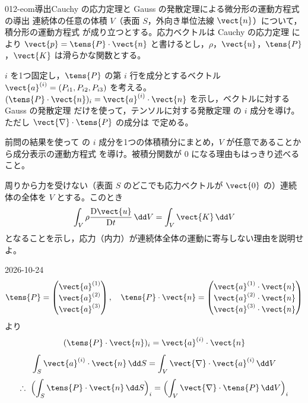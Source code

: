 \documentclass[uplatex,dvipdfmx,a4paper,11pt]{jsarticle}
\begin{document}
\begin{mondai}{012-eom}{導出}{Cauchy の応力定理と Gauss の発散定理による微分形の運動方程式の導出}
連続体の任意の体積 $V$（表面 $S$，外向き単位法線 $\vect{n}$）について，積分形の運動方程式  が成り立つとする。応力ベクトルは Cauchy の応力定理  により $\vect{p}=\tens{P}\cdot\vect{n}$ と書けるとし，$\rho$，$\vect{u}$，$\tens{P}$，$\vect{K}$ は滑らかな関数とする。
\begin{shoumon}
  \item $i$ を1つ固定し，$\tens{P}$ の第 $i$ 行を成分とするベクトル $\vect{a}^{(i)}=(P_{i1},P_{i2},P_{i3})$ を考える。$(\tens{P}\cdot\vect{n})_i=\vect{a}^{(i)}\cdot\vect{n}$ を示し，ベクトルに対する Gauss の発散定理  だけを使って，テンソルに対する発散定理  の $i$ 成分を導け。ただし $\vect{\nabla}\cdot\tens{P}$ の成分は  で定める。
  \item 前問の結果を使って  の $i$ 成分を1つの体積積分にまとめ，$V$ が任意であることから成分表示の運動方程式  を導け。被積分関数が $0$ になる理由もはっきり述べること。
  \item 周りから力を受けない（表面 $S$ のどこでも応力ベクトルが $\vect{0}$ の）連続体の全体を $V$ とする。このとき
  \[ \int_V \rho\frac{\mathrm{D}\vect{u}}{\mathrm{D}t}\,\dd V=\int_V \vect{K}\,\dd V \]
  となることを示し，応力（内力）が連続体全体の運動に寄与しない理由を説明せよ。
\end{shoumon}
\begin{kotaeutsushi}{2026-10-24}
\[ \tens{P}=\begin{pmatrix}\vect{a}^{(1)}\\\vect{a}^{(2)}\\\vect{a}^{(3)}\end{pmatrix},\quad \tens{P}\cdot\vect{n}=\begin{pmatrix}\vect{a}^{(1)}\cdot\vect{n}\\\vect{a}^{(2)}\cdot\vect{n}\\\vect{a}^{(3)}\cdot\vect{n}\end{pmatrix} \]
より
\[ (\tens{P}\cdot\vect{n})_{i}=\vect{a}^{(i)}\cdot\vect{n} \]
\[ \int_{S}\vect{a}^{(i)}\cdot\vect{n}\,\dd S=\int_{V}\vect{\nabla}\cdot\vect{a}^{(i)}\,\dd V \]
\[ \therefore\ \Bigl(\int_{S}\tens{P}\cdot\vect{n}\,\dd S\Bigr)_{i}=\Bigl(\int_{V}\vect{\nabla}\cdot\tens{P}\,\dd V\Bigr)_{i} \]

\end{kotaeutsushi}
\end{mondai}
\end{document}
